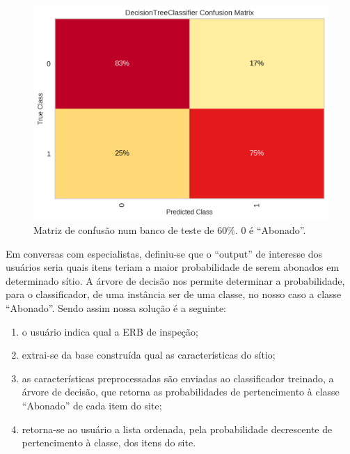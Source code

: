 \documentclass[
	12pt,				%
	openany,			%
	oneside,			%
	a4paper,			%
	english,			%
	french,				%
	spanish,			%
	brazil,				%
	]{abntex2}
\begin{document}
 \begin{figure}[h]
   \centering
  \includegraphics[scale=0.8]{img/confusionmatrix.png}
  \caption{Matriz de confusão num banco de teste de 60\%. 0 é ``Abonado''.}
  \label{ref:figmatriz}
\end{figure}





Em conversas com especialistas, definiu-se que o ``output'' de interesse dos
usuários seria quais itens teriam a maior probabilidade de serem abonados em
determinado sítio. A árvore de decisão nos permite determinar a probabilidade,
para o classificador, de uma instância ser de uma classe, no nosso caso a classe
``Abonado''. Sendo assim nossa solu\c{c}ão é a seguinte:

\begin{enumerate}
\item o usuário indica qual a ERB de inspe\c{c}ão;
\item extrai-se da base construída qual as características do sítio;
\item as características preprocessadas são enviadas ao classificador treinado,
  a árvore de decisão, que retorna as probabilidades de pertencimento à classe
  ``Abonado'' de cada item do site;
  \item retorna-se ao usuário a lista ordenada, pela probabilidade decrescente
    de pertencimento à classe, dos itens do site.
\end{enumerate}
\end{document}
